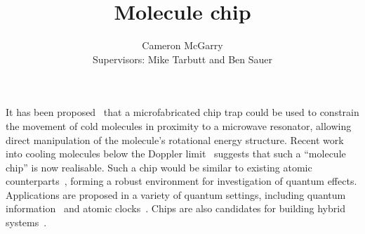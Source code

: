 \documentclass[a4paper]{article}
\title{Molecule chip}
\author{Cameron McGarry\\ 
Supervisors: Mike Tarbutt and Ben Sauer}
\begin{document}
\maketitle





It has been proposed~\cite{Andre2006} that a microfabricated chip trap could be
used to constrain the movement of cold molecules in proximity to a microwave
resonator, allowing direct manipulation of the molecule's rotational energy
structure. Recent work into cooling molecules below the Doppler
limit~\cite{Truppe2017} suggests that such a ``molecule chip'' is now realisable.
Such a chip would be similar to existing atomic
counterparts~\cite{RevModPhys.79.235, 2011Ac}, forming a robust environment for
investigation of quantum effects. Applications are proposed in a variety of
quantum settings, including quantum information~\cite{Folman2000} and
atomic clocks~\cite{RAMIREZMARTINEZ2011247}. Chips are also candidates for
building hybrid systems~\cite{Nirrengarten2006}.

%
%
%




\end{document}
